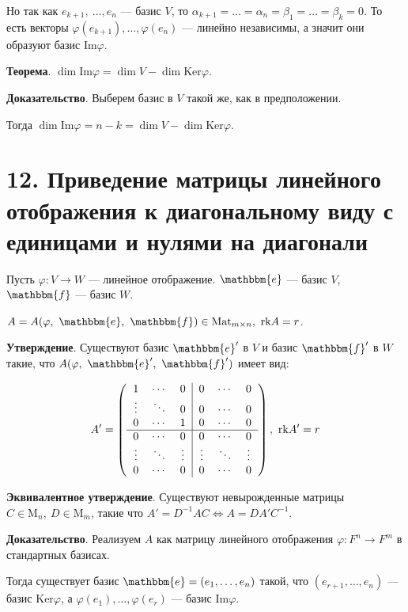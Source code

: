 \documentclass[a4paper, 12pt]{article}
\newcommand{\me}{\mathbbm{e}}
\newcommand{\mf}{\mathbbm{f}}
\newcommand{\Ker}{\text{Ker}}
\newcommand{\Mat}{\text{Mat}}
\newcommand{\rk}{\text{rk}}
\renewcommand{\Im}{\text{Im}}
\begin{document}
\vspace{-3mm}
Но так как $e_{k + 1},\ \ldots, e_n$ --- базис $V$, то $\alpha_{k + 1} = \ldots = \alpha_n = \beta_{1} = \ldots = \beta_k = 0$. То есть векторы $\varphi(e_{k + 1}), \ldots, \varphi(e_n)$ --- линейно независимы, а значит они образуют базис $\Im\varphi$.

\vspace{5mm}
\textbf{Теорема}. $\dim\Im\varphi = \dim V - \dim\Ker\varphi$.

\textbf{Доказательство}. Выберем базис в $V$ такой же, как в предположении.

Тогда $\dim\Im\varphi = n - k = \dim V - \dim\Ker\varphi$.

\section*{12. Приведение матрицы линейного отображения к диагональному виду с единицами и нулями на диагонали}
Пусть $\varphi: V \rightarrow W$ --- линейное отображение. $\me$ --- базис $V$, $\mf$ --- базис $W$.

$A = A(\varphi,\ \me,\ \mf) \in \Mat_{m \times n},\ \rk A = r$. 

\textbf{Утверждение}. Существуют базис $\me'$ в $V$ и базис $\mf'$ в $W$ такие, что $A(\varphi,\ \me',\ \mf')$ имеет вид:

\vspace{-3mm}
\[
A' =
\left(\begin{tabular}{ccc|ccc}
1 & $\cdots$ & 0 & 0 & $\cdots$ & 0 \\
$\vdots$ & $\ddots$ & 0 & 0 & $\cdots$ & 0 \\
0 & $\cdots$ & 1 & 0 & $\cdots$ & 0 \\ \hline
0 & $\cdots$ & 0 & 0 & $\cdots$ & 0 \\
$\vdots$ & $\ddots$ & $\vdots$ & $\vdots$ & $\ddots$ & $\vdots$ \\
0 & $\cdots$ & 0 & 0 & $\cdots$ & 0
\end{tabular}\right),\ \rk A' = r
\]

\vspace{5mm}
\textbf{Эквивалентное утверждение}. Существуют невырожденные матрицы $C \in \text{M}_n,\ D \in \text{M}_m$, такие что $A' = D^{-1}AC \Longleftrightarrow A = DA'C^{-1}$.

\textbf{Доказательство}. Реализуем $A$ как матрицу линейного отображения $\varphi: F^n \rightarrow F^m$ в стандартных базисах.

Тогда существует базис $\me = (e_1, \ldots, e_n)$ такой, что $(e_{r + 1}, \ldots, e_n)$
--- базис $\Ker\varphi$, а $\varphi(e_1), \ldots, \varphi(e_r)$ --- базис $\Im\varphi$.
\end{document}
